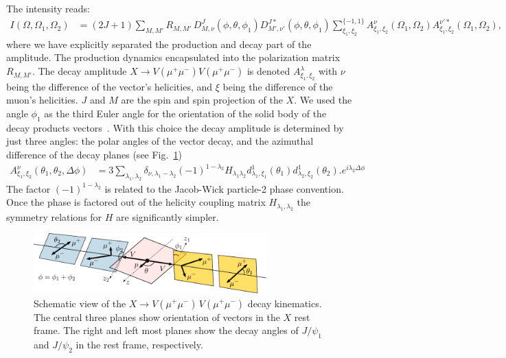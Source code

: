 \documentclass[prd,preprintnumbers,floatfix,
nofootinbib,superscriptaddress]{revtex4}
\begin{document}
The intensity reads:
\begin{align}
    I(\Omega,\Omega_1,\Omega_2) &= (2J+1) \sum_{M,M'}R_{M,M'}\,
    D_{M,\nu}^{J}(\phi,\theta,\phi_1) D_{M',\nu'}^{J*}(\phi,\theta,\phi_1)
    \sum_{\xi_1,\xi_2}^{\{-1,1\}}
    A^{\nu}_{\xi_1,\xi_2}(\Omega_1,\Omega_2) A^{\nu'*}_{\xi_1,\xi_2}(\Omega_1,\Omega_2),
\end{align}
where we have explicitly separated the production and decay part of the amplitude.
The production dynamics encapsulated into the polarization matrix $R_{M,M'}$.
The decay amplitude $X\to V(\mu^+\mu^-)V(\mu^+\mu^-)$ is denoted $A^{\lambda}_{\xi_1,\xi_2}$
with $\nu$ being the difference of the vector's helicities, and $\xi$ being the difference of the muon's helicities. $J$ and $M$ are the spin and spin projection of the $X$.
We used the angle $\phi_1$ as the third Euler angle for the orientation of
the solid body of the decay products vectors~\cite{DPD}. With this choice the
decay amplitude is determined by just three angles:
the polar angles of the vector decay, and the azimuthal difference of the decay planes (see Fig.~\ref{fig:X.decay})
\begin{align}
  A^{\nu}_{\xi_1,\xi_2}(\theta_1,\theta_2,\Delta\phi) &= 3
  \sum_{\lambda_1,\lambda_2}
  \delta_{\nu,\lambda_1-\lambda_2} (-1)^{1-\lambda_2}
  H_{\lambda_1\lambda_2}
  d_{\lambda_1,\xi_1}^{1}(\theta_1) d_{\lambda_2,\xi_2}^{1}(\theta_2).
  e^{i\lambda_2 \Delta\phi}
\end{align}
The factor $(-1)^{1-\lambda_2}$ is related to the Jacob-Wick particle-2 phase convention.
Once the phase is factored out of the helicity coupling matrix $H_{\lambda_1,\lambda_2}$
the symmetry relations for $H$ are significantly simpler.
\begin{figure}
  \includegraphics[width=0.8\textwidth]{../plots/angles.pdf}
  \caption{Schematic view of the $X\to V(\mu^+\mu^-)\,V(\mu^+\mu^-)$ decay kinematics.
  The central three planes show orientation of vectors in the $X$ rest frame.
  The right and left most planes show the decay angles of $J/\psi_1$ and $J/\psi_2$ in the rest frame, respectively.
  }
  \label{fig:X.decay}
\end{figure}
\end{document}
